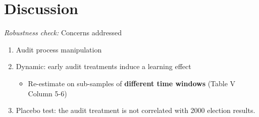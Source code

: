 \section{Discussion}
    
    \frame{\sectionpage}
    
    \begin{frame}{\textit{Robustness check:} Concerns addressed}

        \begin{enumerate}
            \item<2-> Audit process manipulation
            \item<6-> Dynamic: early audit treatments induce a learning effect
            \begin{itemize}
                \item<7-> Re-estimate on sub-samples of \textbf{\color{orange}different time windows} {\scriptsize (Table V Column 5-6)}
            \end{itemize}

            \item<8-> Placebo test: the audit treatment is not correlated with 2000 election results.
            
        \end{enumerate}
    
    \end{frame}

